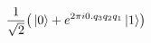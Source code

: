 \documentclass[preview]{standalone}
\begin{document}
\begin{align*}
\frac{1}{\sqrt{2}} \bigr( \ket{0} + e^{2\pi i 0.q_{3}q_{2}q_{1} } \ket{1}\bigr)
\end{align*}
\end{document}
